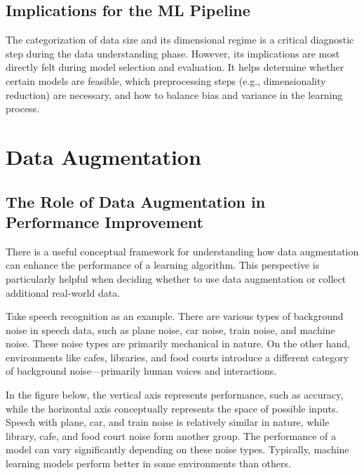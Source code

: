 \documentclass[12pt,openany]{book}
\begin{document}
\subsection{Implications for the ML Pipeline}

The categorization of data size and its dimensional regime is a critical diagnostic step during the data understanding phase. However, its implications are most directly felt during model selection and evaluation. It helps determine whether certain models are feasible, which preprocessing steps (e.g., dimensionality reduction) are necessary, and how to balance bias and variance in the learning process.






\section{Data Augmentation}

\subsection{The Role of Data Augmentation in Performance Improvement}

There is a useful conceptual framework for understanding how data augmentation can enhance the performance of a learning algorithm. This perspective is particularly helpful when deciding whether to use data augmentation or collect additional real-world data. 
\newline

Take speech recognition as an example. There are various types of background noise in speech data, such as plane noise, car noise, train noise, and machine noise. These noise types are primarily mechanical in nature. On the other hand, environments like cafes, libraries, and food courts introduce a different category of background noise—primarily human voices and interactions. 
\newline

In the figure below, the vertical axis represents performance, such as accuracy, while the horizontal axis conceptually represents the space of possible inputs. Speech with plane, car, and train noise is relatively similar in nature, while library, cafe, and food court noise form another group. The performance of a model can vary significantly depending on these noise types. Typically, machine learning models perform better in some environments than others. 
\newline
\end{document}
